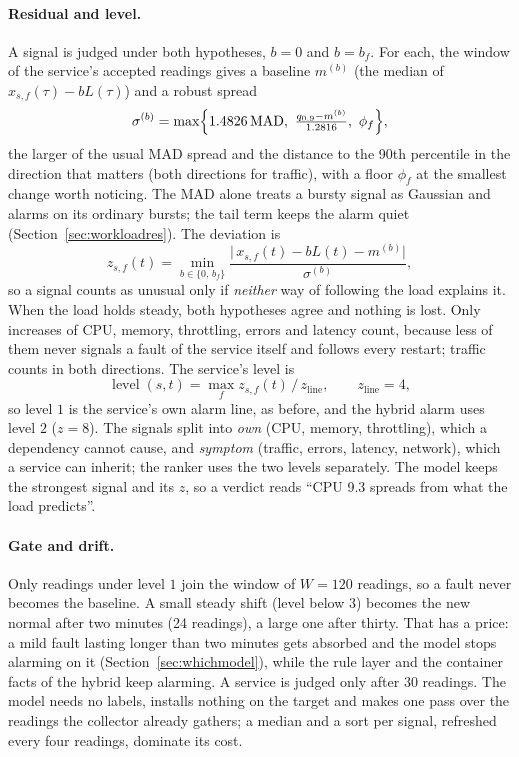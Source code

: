 \paragraph{Residual and level.} A signal is judged under both hypotheses, $b = 0$ and $b = b_f$. For each, the window of the service's accepted readings gives a baseline $m^{(b)}$ (the median of $x_{s,f}(\tau) - b L(\tau)$) and a robust spread
\begin{equation}
\sigma^{(b)} = \max\Bigl\{ 1.4826\operatorname{MAD},\ \tfrac{q_{0.9} - m^{(b)}}{1.2816},\ \phi_f \Bigr\},
\end{equation}
the larger of the usual MAD spread and the distance to the 90th percentile in the direction that matters (both directions for traffic), with a floor $\phi_f$ at the smallest change worth noticing. The MAD alone treats a bursty signal as Gaussian and alarms on its ordinary bursts; the tail term keeps the alarm quiet (Section~\ref{sec:workloadres}). The deviation is
\begin{equation}
z_{s,f}(t) = \min_{b \in \{0,\, b_f\}} \frac{\bigl|\, x_{s,f}(t) - b L(t) - m^{(b)} \bigr|}{\sigma^{(b)}},
\end{equation}
so a signal counts as unusual only if \emph{neither} way of following the load explains it. When the load holds steady, both hypotheses agree and nothing is lost. Only increases of CPU, memory, throttling, errors and latency count, because less of them never signals a fault of the service itself and follows every restart; traffic counts in both directions. The service's level is
\begin{equation}
\operatorname{level}(s,t) = \max_f z_{s,f}(t) \,/\, z_{\mathrm{line}}, \qquad z_{\mathrm{line}} = 4,
\label{eq:level}
\end{equation}
so level $1$ is the service's own alarm line, as before, and the hybrid alarm uses level $2$ ($z = 8$). The signals split into \emph{own} (CPU, memory, throttling), which a dependency cannot cause, and \emph{symptom} (traffic, errors, latency, network), which a service can inherit; the ranker uses the two levels separately. The model keeps the strongest signal and its $z$, so a verdict reads ``CPU 9.3 spreads from what the load predicts''.

\paragraph{Gate and drift.} Only readings under level $1$ join the window of $W = 120$ readings, so a fault never becomes the baseline. A small steady shift (level below $3$) becomes the new normal after two minutes (24 readings), a large one after thirty. That has a price: a mild fault lasting longer than two minutes gets absorbed and the model stops alarming on it (Section~\ref{sec:whichmodel}), while the rule layer and the container facts of the hybrid keep alarming. A service is judged only after $30$ readings. The model needs no labels, installs nothing on the target and makes one pass over the readings the collector already gathers; a median and a sort per signal, refreshed every four readings, dominate its cost.

